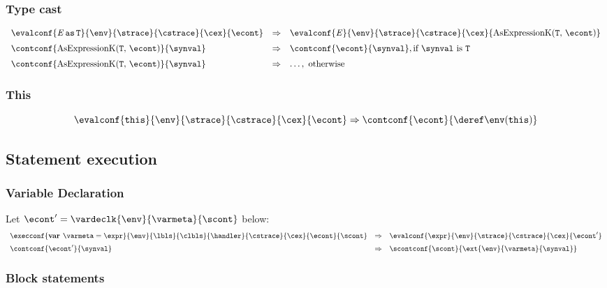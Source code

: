 \documentclass{article}
\begin{document}
\subsubsection{Type cast}
\label{subsubsec:type-cast}
\newcommand{\AsExpressionK}{\mathrm{AsExpressionK}(\tt{T},\,\econt)}
\[
  \begin{array}{lcl}
	\evalconf{\AsExpression{\expressionmeta}{\tt{T}}}{\env}{\strace}{\cstrace}{\cex}{\econt}
	& \Rightarrow &
	\evalconf{\expressionmeta}{\env}{\strace}{\cstrace}{\cex}{\AsExpressionK}\\[2mm]

	\contconf{\AsExpressionK}{\synval}
	& \Rightarrow &
	\contconf{\econt}{\synval}, \textrm{if }\synval \textrm{ is } \tt{T}\\[2mm]

	\contconf{\AsExpressionK}{\synval}
	& \Rightarrow &
	\dots, \textrm{ otherwise}
    \end{array}
\]

\subsubsection{This}
\[
	\evalconf{\ThisExpression}{\env}{\strace}{\cstrace}{\cex}{\econt}
	\Rightarrow
	\contconf{\econt}{\deref\env(\this)}
\]
\subsection{Statement execution}
\label{subsec:stmt-exectution}

\subsubsection{Variable Declaration}

Let $\econt' = \vardeclk{\env}{\varmeta}{\scont}$ below:
\[
  \begin{array}{lcl}
	\execconf{\textbf{var } \varmeta = \expr}{\env}{\lbls}{\clbls}{\handler}{\cstrace}{\cex}{\econt}{\scont}
	& \Rightarrow &
	\evalconf{\expr}{\env}{\strace}{\cstrace}{\cex}{\econt'}\\[2mm]

	\contconf{\econt'}{\synval}
	& \Rightarrow &
	\scontconf{\scont}{\ext{\env}{\varmeta}{\synval}}

  \end{array}
\]
\subsubsection{Block statements}
\end{document}
